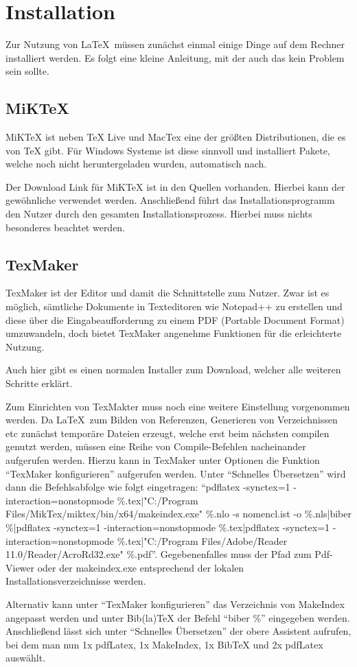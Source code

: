 
\chapter{Installation}
\label{ch:installation}
Zur Nutzung von \LaTeX\ müssen zunächst einmal einige Dinge auf dem Rechner installiert werden. Es folgt eine kleine Anleitung, mit der auch das kein Problem sein sollte.

\section{MiKTeX}
MiKTeX ist neben TeX Live und MacTex eine der größten Distributionen, die es von TeX gibt. Für Windows Systeme ist diese sinnvoll und installiert Pakete, welche noch nicht heruntergeladen wurden, automatisch nach.

Der Download Link für MiKTeX ist in den Quellen vorhanden.\autocite[Vgl.][]{miktex} Hierbei kann der gewöhnliche  verwendet werden. Anschließend führt das Installationsprogramm den Nutzer durch den gesamten Installationsprozess. Hierbei muss nichts besonderes beachtet werden.

\section{TexMaker}
TexMaker ist der Editor und damit die Schnittstelle zum Nutzer. Zwar ist es möglich, sämtliche Dokumente in Texteditoren wie Notepad++ zu erstellen und diese über die Eingabeaufforderung zu einem PDF (Portable Document Format) umzuwandeln, doch bietet TexMaker angenehme Funktionen für die erleichterte Nutzung.

Auch hier gibt es einen normalen Installer zum Download, welcher alle weiteren Schritte erklärt.\autocite[Vgl.][]{texmaker}

Zum Einrichten von TexMakter muss noch eine weitere Einstellung vorgenommen werden. Da \LaTeX\ zum Bilden von Referenzen, Generieren von Verzeichnissen etc zunächst temporäre Dateien erzeugt, welche erst beim nächsten compilen genutzt werden, müssen eine Reihe von Compile-Befehlen nacheinander aufgerufen werden. Hierzu kann in TexMaker unter Optionen die Funktion \enquote{TexMaker konfigurieren} aufgerufen werden. Unter \enquote{Schnelles Übersetzen} wird dann die Befehlsabfolge wie folgt eingetragen: \enquote{pdflatex -synctex=1 -interaction=nonstopmode \%.tex|"C:/Program Files/MikTex/miktex/bin/x64/makeindex.exe" \%.nlo -s nomencl.ist -o \%.nls|biber \%|pdflatex -synctex=1 -interaction=nonstopmode \%.tex|pdflatex -synctex=1 -interaction=nonstopmode \%.tex|"C:/Program Files/Adobe/Reader 11.0/Reader/AcroRd32.exe" \%.pdf}. Gegebenenfalles muss der Pfad zum Pdf-Viewer oder der makeindex.exe entsprechend der lokalen Installationsverzeichnisse werden.

Alternativ kann unter \enquote{TexMaker konfigurieren} das Verzeichnis von MakeIndex angepasst werden und unter Bib(la)TeX der Befehl \enquote{biber \%} eingegeben werden. Anschließend lässt sich unter \enquote{Schnelles Übersetzen} der obere Assistent aufrufen, bei dem man nun 1x pdfLatex, 1x MakeIndex, 1x BibTeX und 2x pdfLatex auswählt. 